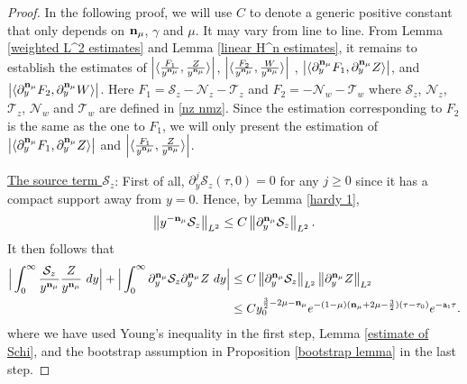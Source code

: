 \documentclass{article}
\newcommand{\norm}[1]{\left\lVert#1\right\rVert}
\newcommand{\ga}{\gamma}
\newcommand{\pa}{\partial}
\def\espz{Z}
\def\espw{W}
\def\nz{\mathcal N_z}
\def\nw{\mathcal N_w}
\def\nmz{\mathcal T_z}
\def\nmw{\mathcal T_w}
\def\epone{\mathtt{a_1}}
\def\ndmu{{\bf{n}_{\mu}}}
\numberwithin{equation}{section}
\begin{document}
\begin{proof}
    In the following proof, we will use $C$ to denote a generic positive constant that only depends
on $\ndmu$, $\ga$ and $\mu$. It may vary from line to line.
    From Lemma \ref{weighted L^2 estimates} and Lemma \ref{linear H^n estimates}, it remains to establish  the estimates of $\left| \langle \frac{F_1}{y^\ndmu},\frac{\espz}{y^\ndmu} \rangle\right|$,  $\left| \langle \frac{F_2}{y^\ndmu},\frac{\espw}{y^\ndmu} \rangle\right| $ , $\left|\langle \pa_y^\ndmu F_1, \pa_y^\ndmu \espz \rangle \right|$, and $ \left|\langle \pa_y^\ndmu F_2, \pa_y^\ndmu \espw \rangle \right|$. Here $F_1= \mathcal S_z - \nz - \nmz$ and $F_2= - \nw - \nmw$ where $\mathcal S_z$, $\nz$, $\nmz$, $\nw$ and $\nmw$ are defined in \eqref{nz nmz}. 
    Since the estimation corresponding to $F_2$ is the same as the one to $F_1$, we will only present the estimation of $\left|\langle \pa_y^\ndmu F_1, \pa_y^\ndmu \espz \rangle \right|$ and $\left| \langle \frac{F_1}{y^\ndmu},\frac{\espz}{y^\ndmu} \rangle\right|$. 
    
	\noindent\underline{The source term $\mathcal S_z$}:
    First of all, $\pa_y^j\mathcal S_z(\tau,0)=0$ for any $j\geq 0$ since it has a compact support away from $y=0$. Hence, by Lemma \ref{hardy 1}, 
    \[
        \norm{y^{-\ndmu}\mathcal S_z}_{L^2} \leq C\norm{\pa_y^{\ndmu}\mathcal S_z}_{L^2}.
    \]
    It then follows that
    \[
    \begin{split}
      \Big|  \int_0^\infty \frac{\mathcal S_z}{y^{\ndmu}} \frac{\espz}{y^{\ndmu}} \ dy \Big| + \Big|\int_0^\infty \pa_y^\ndmu\mathcal S_z \pa_y^\ndmu \espz \ dy \Big| 
       &\leq C\norm{\pa_y^\ndmu\mathcal S_z}_{L^2}\norm{\pa_y^\ndmu \espz}_{L^2} \\
       & \leq C {y_0^{\frac32-2\mu-\ndmu}}e ^{-(1-\mu)(\ndmu +2\mu -\frac{3}{2}) (\tau-\tau_0)} e^{-\epone \tau}.
   \end{split}
    \]
    where we have used Young's inequality in the first step, Lemma \ref{estimate of Schi}, and the bootstrap assumption in Proposition \ref{bootstrap lemma} in the last step. 
    

\end{proof}
\end{document}
